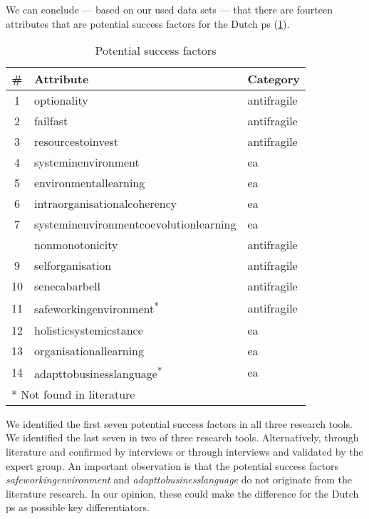 We can conclude --- based on our used data sets --- that there are fourteen \glspl{attribute} that are potential success factors for the Dutch \gls{ps} (\cref{tab:identifiedsuccessfactors}). 
\begin{table}[H]
	\centering
	\begin{tabular}{@{}cll@{}}
		\toprule
		\textbf{\#} & \textbf{Attribute} & \textbf{Category} \\%
		\midrule
		1 & \Gls{optionality} & \Gls{antifragile} \\%
		2 & \Gls{failfast} & \Gls{antifragile} \\%
		3 & \Gls{resourcestoinvest} & \Gls{antifragile} \\%
		4 & \Gls{systeminenvironment} & \gls{ea} \\%
		5 & \Gls{environmentallearning} & \gls{ea} \\%
		6 & \Gls{intraorganisationalcoherency} & \gls{ea} \\%
		7 & \Gls{systeminenvironmentcoevolutionlearning} & \gls{ea} \\%
		\hdashline %
		8 & \Gls{nonmonotonicity} & \Gls{antifragile}  \\%
		9 & \Gls{selforganisation} & \Gls{antifragile}  \\%
		10 & \Gls{senecabarbell} & \Gls{antifragile}  \\%
		11 & \Gls{safeworkingenvironment}\textsuperscript{*} & \Gls{antifragile}  \\%
		12 & \Gls{holisticsystemicstance} & \gls{ea}  \\%
		13 & \Gls{organisationallearning} & \gls{ea}  \\%
		14 & \Gls{adapttobusinesslanguage}\textsuperscript{*} & \gls{ea}  \\%
		\bottomrule
		\multicolumn{2}{l}{* Not found in literature}
	\end{tabular}%
	\caption[Potential success factors]{Potential success factors}
	\label{tab:identifiedsuccessfactors}%
\end{table}%
We identified the first seven potential success factors in all three research tools. We identified the last seven in two of three research tools. Alternatively, through literature and confirmed by interviews or through interviews and validated by the expert group. An important observation is that the potential success factors \textit{\gls{safeworkingenvironment}} and \textit{\gls{adapttobusinesslanguage}} do not originate from the literature research. In our opinion, these could make the difference for the Dutch \gls{ps} as possible key differentiators. 

